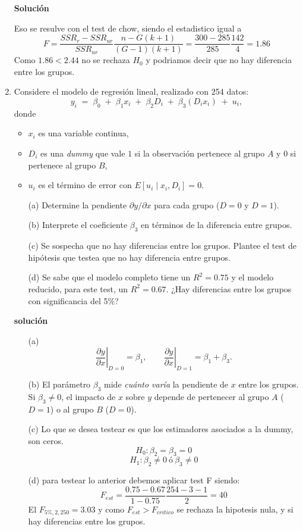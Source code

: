 \documentclass[10pt,a4paper]{article}
\begin{document}
\begin{enumerate}
\textbf{Solución}

Eso se resulve con el test de chow, siendo el estadistico igual a 
$$F = \frac{SSR_r-SSR_{ur}}{SSR_{ur}}\frac{n-G(k+1)}{(G-1)(k+1)}=\frac{300-285}{285}\frac{142}{4}=1.86$$
Como $1.86<2.44$ no se rechaza $H_0$ y podriamos decir que no hay diferencia entre los grupos.



\item Considere el modelo de regresión lineal, realizado con 254 datos:
\[
y_i \;=\; \beta_0 \;+\; \beta_1 x_i \;+\; \beta_2 D_i \;+\; \beta_3 (D_i x_i) \;+\; u_i,
\]
donde
\begin{itemize}
  \item $x_i$ es una variable continua,
  \item $D_i$ es una \emph{dummy} que vale $1$ si la observación pertenece al grupo $A$ y $0$ si pertenece al grupo $B$,
  \item $u_i$ es el término de error con $E[u_i \mid x_i,D_i]=0$.
\end{itemize}

\begin{enumerate}
  \item[(a)] Determine la pendiente $\partial y / \partial x$ para cada grupo ($D=0$ y $D=1$).
  \item[(b)] Interprete el coeficiente $\beta_3$ en términos de la diferencia entre grupos.
  \item[(c)] Se sospecha que no hay diferencias entre los grupos. Plantee el test de hipótesis que testea que no hay diferencia entre grupos.
  \item[(d)] Se sabe que el modelo completo tiene un $R^2=0.75$ y el modelo reducido, para este test, un $R^2=0.67$. ¿Hay diferencias entre los grupos con significancia del 5\%?
\end{enumerate}


\textbf{solución}
\begin{enumerate}
  \item[(a)] 
    \[
      \left.\frac{\partial y}{\partial x}\right|_{D=0} = \beta_1, 
      \qquad
      \left.\frac{\partial y}{\partial x}\right|_{D=1} = \beta_1 + \beta_3.
    \]
  \item[(b)] El parámetro $\beta_3$ mide \emph{cuánto varía} la pendiente de $x$ entre los grupos.  
        Si $\beta_3 \neq 0$, el impacto de $x$ sobre $y$ depende de pertenecer al grupo $A$ ($D=1$) o al grupo $B$ ($D=0$).
  \item[(c)] Lo que se desea testear es que los estimadores asociados a la dummy, son ceros.
  $$H_0:\beta_2=\beta_3=0$$
  $$H_1 : \beta_2 \neq 0 \ ó \ \beta_3 \neq 0$$

  \item[(d)] para testear lo anterior debemos aplicar test F siendo:
  $$F_{est} = \frac{0.75-0.67}{1-0.75}\frac{254-3-1}{2}=40$$
  El $F_{5\%,2,250}=3.03$
y como $F_{est}>F_{critico}$ se rechaza la hipotesis nula, y si hay diferencias entre los grupos.
\end{enumerate}

\end{enumerate}

    
\end{document}
